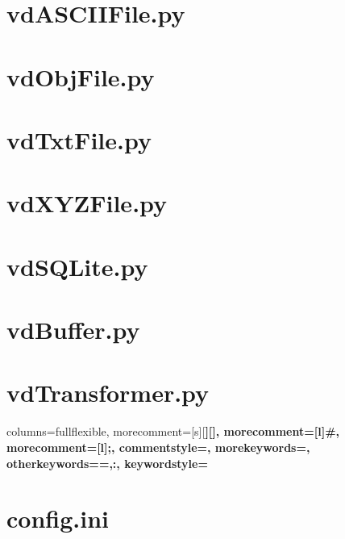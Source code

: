 \documentclass[a4paper,12pt,bibliography=totoc, listof=totoc,titlepage,pointlessnumbers]{scrreprt}
\begin{document}
\begin{appendices}
\section{vdASCIIFile.py}
\label{a:vdASCIIFile.py}


\section{vdObjFile.py}
\label{a:vdObjFile.py}


\section{vdTxtFile.py}
\label{a:vdTxtFile.py}


\section{vdXYZFile.py}
\label{a:vdXYZFile.py}


\section{vdSQLite.py}
\label{a:vdSQLite.py}


\section{vdBuffer.py}
\label{a:vdBuffer.py}


\section{vdTransformer.py}
\label{a:vdTransformer.py}



{
    columns=fullflexible,
    morecomment=[s][\color{Orchid}\bfseries]{[}{]},
    morecomment=[l]{\#},
    morecomment=[l]{;},
    commentstyle=\color{gray}\ttfamily,
    morekeywords={},
    otherkeywords={=,:},
    keywordstyle={\color{green}\bfseries}
}

\section{config.ini}
\label{a:config.ini}



\end{appendices}
\end{document}

